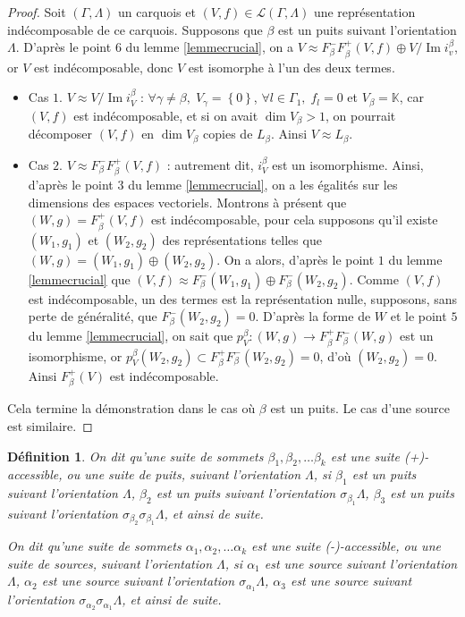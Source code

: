 \documentclass[a4paper,11pt]{article}
\newtheorem{defi}[thm]{Définition}%
\DeclareMathOperator{\Img}{Im}
\begin{document}
\begin{proof}
	Soit $(\Gamma,\Lambda)$ un carquois et $(V,f)\in\mathscr L(\Gamma,\Lambda)$ une représentation indécomposable de ce carquois. Supposons que $\beta$ est un puits suivant l'orientation $\Lambda$. D'après le point $6$ du lemme \ref{lemmecrucial}, on a $V\approx F_\beta^-F_\beta^+(V,f)\oplus V/\Img i_v^\beta$, or $V$ est indécomposable, donc $V$ est isomorphe à l'un des deux termes.
	\begin{itemize}
		\item Cas $1$. $V\approx V/\Img i_V^\beta$ : $\forall \gamma\neq\beta,\;V_\gamma=\left\{ 0 \right\}$, $\forall l\in\Gamma_1,\;f_l=0$ et $V_\beta=\mathbb K$, car $(V,f)$ est indécomposable, et si on avait $\dim V_\beta>1$, on pourrait décomposer $(V,f)$ en $\dim V_\beta$ copies de $L_\beta$. Ainsi $V\approx L_\beta$.
		\item Cas $2$. $V\approx F_\beta^-F_\beta^+(V,f)$ : autrement dit, $i_V^\beta$ est un isomorphisme. Ainsi, d'après le point $3$ du lemme \ref{lemmecrucial}, on a les égalités sur les dimensions des espaces vectoriels. Montrons à présent que $(W,g)=F_\beta^+(V,f)$ est indécomposable, pour cela supposons qu'il existe $(W_1,g_1)$ et $(W_2,g_2)$ des représentations telles que $(W,g)=(W_1,g_1)\oplus(W_2,g_2)$. On a alors, d'après le point $1$ du lemme \ref{lemmecrucial} que $(V,f)\approx F_\beta^-(W_1,g_1)\oplus F_\beta^-(W_2,g_2)$. Comme $(V,f)$ est indécomposable, un des termes est la représentation nulle, supposons, sans perte de généralité, que $F_\beta^-(W_2,g_2)=0$. D'après la forme de $W$ et le point $5$ du lemme \ref{lemmecrucial}, on sait que $p_V^\beta:(W,g)\rightarrow F_\beta^+F_\beta^-(W,g)$ est un isomorphisme, or $p_V^\beta(W_2,g_2)\subset F_\beta^+F_\beta^-(W_2,g_2)=0$, d'où $(W_2,g_2)=0$. Ainsi $F_\beta^+(V)$ est indécomposable. 
	\end{itemize}
        Cela termine la démonstration dans le cas où $\beta$ est un puits. Le cas d'une source est similaire.
\end{proof}
\begin{defi}
	On dit qu'une suite de sommets $\beta_1,\beta_2,\dots\beta_k$ est une suite \emph{(+)-accessible}, ou une \emph{suite de puits}, suivant l'orientation $\Lambda$, si $\beta_1$ est un puits suivant l'orientation $\Lambda$, $\beta_2$ est un puits suivant l'orientation $\sigma_{\beta_1}\Lambda$, $\beta_3$ est un puits suivant l'orientation $\sigma_{\beta_2}\sigma_{\beta_1}\Lambda$, et ainsi de suite.

	On dit qu'une suite de sommets $\alpha_1,\alpha_2,\dots\alpha_k$ est une suite \emph{(-)-accessible}, ou une \emph{suite de sources}, suivant l'orientation $\Lambda$, si $\alpha_1$ est une source suivant l'orientation $\Lambda$, $\alpha_2$ est une source suivant l'orientation $\sigma_{\alpha_1}\Lambda$, $\alpha_3$ est une source suivant l'orientation $\sigma_{\alpha_2}\sigma_{\alpha_1}\Lambda$, et ainsi de suite.
\end{defi}
\end{document}
